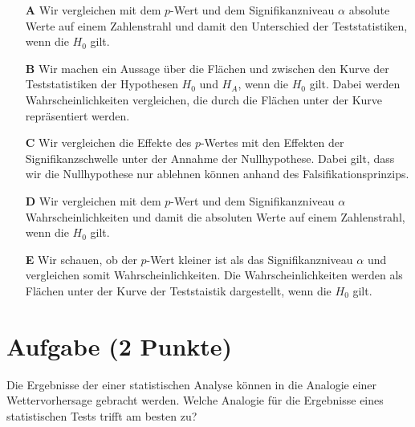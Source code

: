 \documentclass[a4paper, 9pt]{scrartcl}\usepackage[]{graphicx}\usepackage[]{xcolor}
\begin{document}
\begin{enumerate}
\item [\textbf{A} \msquare] Wir vergleichen mit dem $p$-Wert und dem Signifikanzniveau $\alpha$ absolute Werte auf einem Zahlenstrahl und damit den Unterschied der Teststatistiken, wenn die $H_0$ gilt.
\item [\textbf{B} \msquare] Wir machen ein Aussage über die Flächen und zwischen den Kurve der Teststatistiken der Hypothesen $H_0$ und $H_A$, wenn die $H_0$ gilt. Dabei werden Wahrscheinlichkeiten vergleichen, die durch die Flächen unter der Kurve repräsentiert werden.
\item [\textbf{C} \msquare] Wir vergleichen die Effekte des $p$-Wertes mit den Effekten der Signifikanzschwelle unter der Annahme der Nullhypothese. Dabei gilt, dass wir die Nullhypothese nur ablehnen können anhand des Falsifikationsprinzips.
\item [\textbf{D} \msquare] Wir vergleichen mit dem $p$-Wert und dem Signifikanzniveau $\alpha$ Wahrscheinlichkeiten und damit die absoluten Werte auf einem Zahlenstrahl, wenn die $H_0$ gilt.
\item [\textbf{E} \msquare] Wir schauen, ob der $p$-Wert kleiner ist als das Signifikanzniveau $\alpha$ und vergleichen somit Wahrscheinlichkeiten. Die Wahrscheinlichkeiten werden als Flächen unter der Kurve der Teststaistik dargestellt, wenn die $H_0$ gilt.
\end{enumerate}

\section{Aufgabe \hfill (2 Punkte)}



Die Ergebnisse der einer statistischen Analyse können in die Analogie einer Wettervorhersage gebracht werden. Welche Analogie für die Ergebnisse eines statistischen Tests trifft am besten zu?
\end{document}
